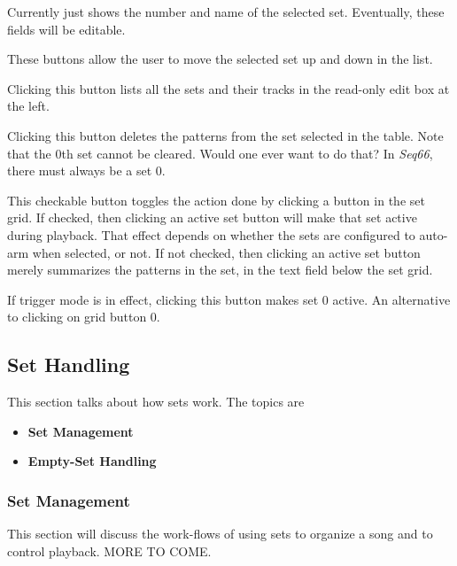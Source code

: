    Currently just shows the number and name of the selected set.
   Eventually, these fields will be editable.

   These buttons allow the user to move the selected set up and down
   in the list.

   Clicking this button lists all the sets and their tracks in the
   read-only edit box at the left.

   Clicking this button deletes the patterns from the 
   set selected in the table.
   Note that the 0th set cannot be cleared.
   Would one ever want to do that?
   In \textsl{Seq66}, there must always be a set 0.

   This checkable button toggles the action done by clicking a button
   in the set grid.
   If checked, then clicking an active set button will make that
   set active during playback.
   That effect depends on whether the sets are configured to auto-arm when
   selected, or not.
   If not checked, then clicking an active set button merely summarizes the
   patterns in the set, in the text field below the set grid.

   If trigger mode is in effect, clicking this button makes
   set 0 active.
   An alternative to clicking on grid button 0.

\subsection{Set Handling}
\label{subsec:setmaster_handling}

   This section talks about how sets work.  The topics are

   \begin{itemize}
      \item \textbf{Set Management}
      \item \textbf{Empty-Set Handling}
   \end{itemize}

\subsubsection{Set Management}
\label{subsubsec:setmaster_management}

   This section will discuss the work-flows of using sets to organize a song
   and to control playback.  MORE TO COME.

